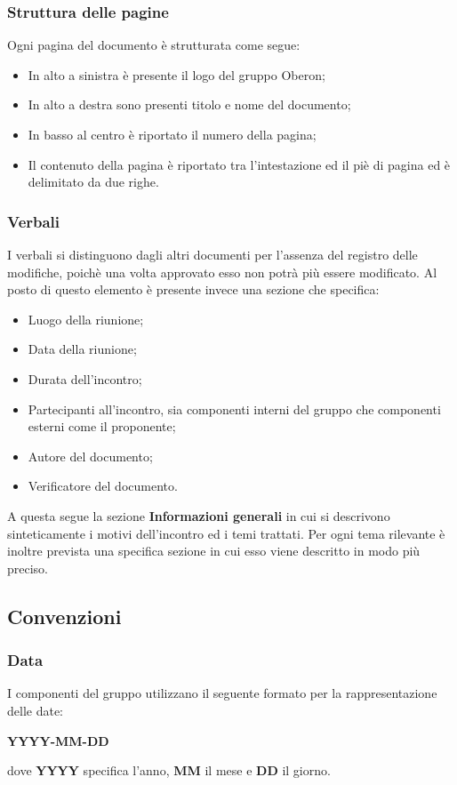 \documentclass{article}
\begin{document}
\subsubsection{Struttura delle pagine}
Ogni pagina del documento è strutturata come segue:
\begin{itemize}
    \item In alto a sinistra è presente il logo del gruppo Oberon;
    \item In alto a destra sono presenti titolo e nome del documento;
    \item In basso al centro è riportato il numero della pagina;
    \item Il contenuto della pagina è riportato tra l'intestazione ed il piè di pagina ed è delimitato da due righe.
\end{itemize}
\subsubsection{Verbali}
I verbali si distinguono dagli altri documenti per l'assenza del registro delle modifiche, poichè una volta approvato esso non potrà più essere modificato. Al posto di questo elemento è presente invece una sezione che specifica:
\begin{itemize}
    \item Luogo della riunione;
    \item Data della riunione;
    \item Durata dell'incontro;
    \item Partecipanti all'incontro, sia componenti interni del gruppo che componenti esterni come il proponente;
    \item Autore del documento;
    \item Verificatore del documento.
\end{itemize}
A questa segue la sezione \textbf{Informazioni generali} in cui si descrivono sinteticamente i motivi dell'incontro ed i temi trattati. Per ogni tema rilevante è inoltre prevista una specifica sezione in cui esso viene descritto in modo più preciso.

\subsection{Convenzioni}
\subsubsection{Data}
I componenti del gruppo utilizzano il seguente formato per la rappresentazione delle date:
\begin{center}
    \textbf{YYYY-MM-DD}
\end{center}
 dove \textbf{YYYY} specifica l'anno, \textbf{MM} il mese e \textbf{DD} il giorno.
\end{document}
